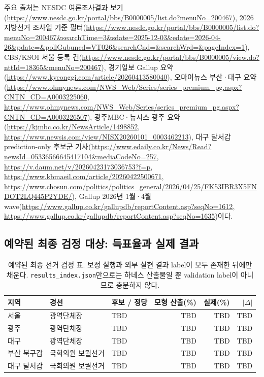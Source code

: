 \documentclass[11pt]{article}
\begin{document}
주요 출처는 NESDC 여론조사결과 보기(\url{https://www.nesdc.go.kr/portal/bbs/B0000005/list.do?menuNo=200467}), 2026 지방선거 조사일 기준 필터(\url{https://www.nesdc.go.kr/portal/bbs/B0000005/list.do?menuNo=200467&searchTime=3&sdate=2025-12-03&edate=2026-04-26&pdate=&pollGubuncd=VT026&searchCnd=&searchWrd=&pageIndex=1}), CBS/KSOI 서울 등록 건(\url{https://www.nesdc.go.kr/portal/bbs/B0000005/view.do?nttId=18365&menuNo=200467}), 경기일보 Gallup 요약(\url{https://www.kyeonggi.com/article/20260413580040}), 오마이뉴스 부산·대구 요약(\url{https://www.ohmynews.com/NWS_Web/Series/series_premium_pg.aspx?CNTN_CD=A0003225060}, \url{https://www.ohmynews.com/NWS_Web/Series/series_premium_pg.aspx?CNTN_CD=A0003226507}), 광주MBC·뉴시스 광주 요약(\url{https://kjmbc.co.kr/NewsArticle/1498852}, \url{https://www.newsis.com/view/NISX20260101_0003462213}), 대구 달서갑 prediction-only 후보군 기사(\url{https://www.edaily.co.kr/News/Read?newsId=05336566645417104&mediaCodeNo=257}, \url{https://v.daum.net/v/20260423173036753?f=p}, \url{https://www.kbmaeil.com/article/20260422500671}, \url{https://www.chosun.com/politics/politics_general/2026/04/25/FK53IBR3X5FNDOT2LQ445P2YDE/}), Gallup 2026년 1월·4월 wave(\url{https://www.gallup.co.kr/gallupdb/reportContent.asp?seqNo=1612}, \url{https://www.gallup.co.kr/gallupdb/reportContent.asp?seqNo=1635})이다.

\subsection{예약된 최종 검정 대상: 득표율과 실제 결과}

\begin{table}[h]
\centering
\caption{예약된 최종 선거 검정 표. 보정 실행과 외부 실현 결과 label이 모두 존재한 뒤에만 채운다. \texttt{results\_index.json}만으로는 하네스 산출물일 뿐 validation label이 아니므로 충분하지 않다.}
\label{tab:results-vote-share}
\small
\begin{tabular}{lllrrr}
\toprule
지역 & 경선 & 후보 / 정당 & 모형 산출(\%) & 실제(\%) & $|\Delta|$ \\
\midrule
서울 & 광역단체장 & TBD & TBD & TBD & TBD \\
광주 & 광역단체장 & TBD & TBD & TBD & TBD \\
대구 & 광역단체장 & TBD & TBD & TBD & TBD \\
부산 북구갑 & 국회의원 보궐선거 & TBD & TBD & TBD & TBD \\
대구 달서갑 & 국회의원 보궐선거 & TBD & TBD & TBD & TBD \\
\bottomrule
\end{tabular}
\end{table}
\end{document}
